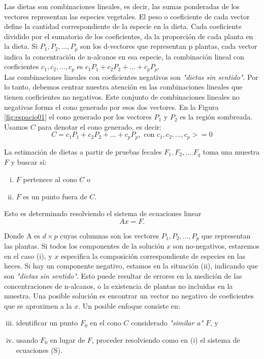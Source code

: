 \documentclass[11pt]{article}
\begin{document}
Las dietas son combinaciones lineales, es decir, las sumas ponderadas de los vectores representan las especies vegetales. El peso o coeficiente de cada vector define la cantidad correspondiente de la especie en la dieta. Cada coeficiente dividido  por el sumatorio de los coeficientes, da la proporción de cada planta en la dieta. Si $P_1, P_2, ..., P_p$ son los d-vectores que representan p plantas, cada vector indica la concentración de n-alcanos en esa especie, la combinación lineal con coeficientes $c_1,c_2, ... , c_p$ es $c_1 P_1 + c_2 P_2 + ... + c_p P_p$. \\
Las combinaciones lineales con coeficientes negativos son \textit{"dietas sin sentido"}. Por lo tanto, debemos centrar nuestra atención en las combinaciones lineales que tienen coeficientes no negativos. Este conjunto de combinaciones lineales no negativas forma el cono generado por esos dos vectores. En la Figura \ref{fig:espacio01} el cono generado por los vectores $P_1$ y $P_2$ es la región sombreada. Usamos $C$ para denotar el cono generado, es decir: $$ C = { c_1 P_1 + c_2 P_2 + ... + c_p P_p, \text{ con } c_1,c_2,...,c_p >=0} $$

La estimación de dietas a partir de pruebas fecales $F_1, F_2, ... . F_q $ toma una muestra $F$ y buscar sí:

\begin{enumerate}[(i)]
\item $F$ pertenece al cono $C$ o
\item $F$ es un punto fuera de $C$.
\end{enumerate}

Esto es determinado resolviendo el sistema de ecuaciones linear $$Ax=F.$$

Donde A es $d \times p$ cuyas columnas son los vectores $P_1, P_2 , ... , P_p$ que representan las plantas. Si todos los componentes de la solución $x$ son no-negativos, estaremos en el caso (i), y $x$ especifica la composición correspondiente de especies en las heces. Si hay un componente negativo, estamos en la situación (ii), indicando que son \textit{"dietas sin sentido"}. Esto puede resultar de errores en la medición de las concentraciones de n-alcanos, o la existencia de plantas no incluidas en la muestra. Una posible solución es encontrar un vector no negativo de coeficientes que se aproximen a la $x$. Un posible enfoque consiste en:

\begin{enumerate}[(i)]
\setcounter{enumi}{2}
\item identificar un punto $F_0$ en el cono $C$ considerado \textit{"similar a"} $F$, y
\item usando $F_0$ en lugar de $F$, proceder resolviendo como en (i) el sistema de ecuaciones (S).
\end{enumerate}
\end{document}
